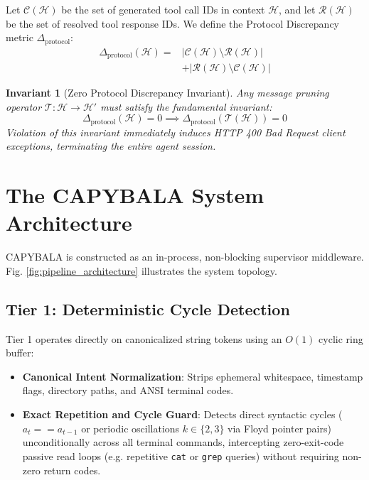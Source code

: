 \documentclass[journal]{IEEEtran}
\newtheorem{invariant}{Invariant}
\begin{document}
Let $\mathcal{C}(\mathcal{H})$ be the set of generated tool call IDs in context $\mathcal{H}$, and let $\mathcal{R}(\mathcal{H})$ be the set of resolved tool response IDs. We define the Protocol Discrepancy metric $\Delta_{\text{protocol}}$:
\begin{equation}
\begin{split}
\Delta_{\text{protocol}}(\mathcal{H}) ={} & |\mathcal{C}(\mathcal{H}) \setminus \mathcal{R}(\mathcal{H})| \\
& + |\mathcal{R}(\mathcal{H}) \setminus \mathcal{C}(\mathcal{H})|
\end{split}
\end{equation}

\begin{invariant}[Zero Protocol Discrepancy Invariant]
Any message pruning operator $\mathcal{T}: \mathcal{H} \to \mathcal{H}'$ must satisfy the fundamental invariant:
\begin{equation}
\Delta_{\text{protocol}}(\mathcal{H}) = 0 \implies \Delta_{\text{protocol}}(\mathcal{T}(\mathcal{H})) = 0
\end{equation}
Violation of this invariant immediately induces HTTP 400 Bad Request client exceptions, terminating the entire agent session.
\end{invariant}

\section{The CAPYBALA System Architecture}

CAPYBALA is constructed as an in-process, non-blocking supervisor middleware. Fig. \ref{fig:pipeline_architecture} illustrates the system topology.

\subsection{Tier 1: Deterministic Cycle Detection}
Tier 1 operates directly on canonicalized string tokens using an $O(1)$ cyclic ring buffer:
\begin{itemize}[leftmargin=12pt, topsep=2pt, itemsep=1pt]
    \item \textbf{Canonical Intent Normalization}: Strips ephemeral whitespace, timestamp flags, directory paths, and ANSI terminal codes.
    \item \textbf{Exact Repetition and Cycle Guard}: Detects direct syntactic cycles ($a_t == a_{t-1}$ or periodic oscillations $k \in \{2, 3\}$ via Floyd pointer pairs) unconditionally across all terminal commands, intercepting zero-exit-code passive read loops (e.g. repetitive \texttt{cat} or \texttt{grep} queries) without requiring non-zero return codes.
\end{itemize}
\end{document}
